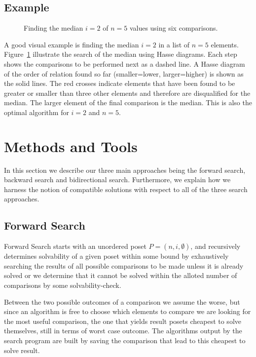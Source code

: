 \documentclass[10pt,journal,compsoc]{IEEEtran}
\begin{document}
\subsection{Example}
\begin{figure}[!b]
  \centering
  
  \caption{Finding the median $i = 2$ of $n = 5$ values using six comparisons.}
  \label{fig:median_of_5}
\end{figure}
A good visual example is finding the median $i=2$ in a list of $n = 5$ elements.
Figure~\ref{fig:median_of_5} illustrate the search of the median using Hasse diagrams.
Each step shows the comparisons to be performed next as a dashed line.
A Hasse diagram of the order of relation found so far (smaller=lower, larger=higher) is shown as the solid lines.
The red crosses indicate elements that have been found to be greater or smaller than three other elements and therefore are disqualified for the median.
The larger element of the final comparison is the median.
This is also the optimal algorithm for $i = 2$ and $n = 5$.


\section{Methods and Tools}
In this section we describe our three main approaches being the forward search, backward search and bidirectional search.
Furthermore, we explain how we harness the notion of compatible solutions with respect to all of the three search approaches.

\subsection{Forward Search}\label{chapter:forward_search}
Forward Search starts with an unordered poset $P=(n,i,\emptyset)$, and recursively determines solvability of a given poset within some bound by exhaustively searching the results of all possible comparisons to be made unless it is already solved or we determine that it cannot be solved within the alloted number of comparisons by some solvability-check.

Between the two possible outcomes of a comparison we assume the worse, but since an algorithm is free to choose which elements to compare we are looking for the most useful comparison, the one that yields result posets cheapest to solve themselves, still in terms of worst case outcome.
The algorithms output by the search program are built by saving the comparison that lead to this cheapest to solve result.
\end{document}
